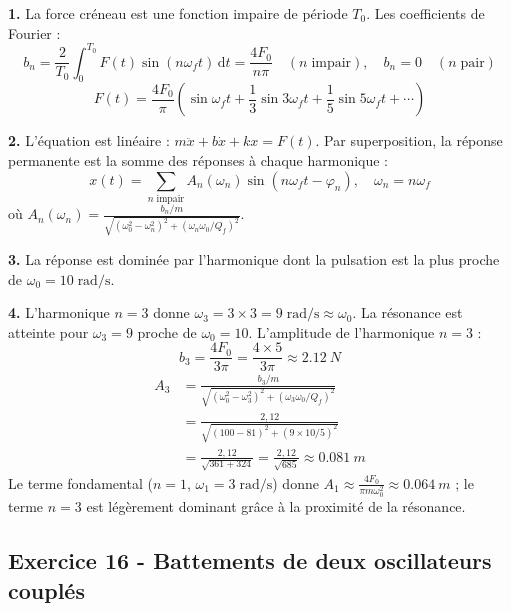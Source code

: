 \documentclass[12pt,a4paper]{article}
\begin{document}
\begin{boitecorrige}
\textbf{1.} La force créneau est une fonction impaire de période $T_0$. Les coefficients de Fourier :
\[
b_n = \frac{2}{T_0}\int_0^{T_0} F(t)\sin(n\omega_f t)\,\text{d}t = \frac{4F_0}{n\pi} \quad (n\;\text{impair}), \quad b_n = 0 \quad (n\;\text{pair})
\]
\[
F(t) = \frac{4F_0}{\pi}\left(\sin\omega_f t + \frac{1}{3}\sin 3\omega_f t + \frac{1}{5}\sin 5\omega_f t + \cdots\right)
\]

\textbf{2.} L'équation est linéaire : $m\ddot{x}+b\dot{x}+kx=F(t)$. Par superposition, la réponse permanente est la somme des réponses à chaque harmonique :
\[
x(t) = \sum_{n\;\text{impair}} A_n(\omega_n)\sin(n\omega_f t - \varphi_n), \quad \omega_n = n\omega_f
\]
où $A_n(\omega_n)=\frac{b_n/m}{\sqrt{(\omega_0^2-\omega_n^2)^2+(\omega_n\omega_0/Q_f)^2}}$.

\textbf{3.} La réponse est dominée par l'harmonique dont la pulsation est la plus proche de $\omega_0=10\;\text{rad/s}$.

\textbf{4.} L'harmonique $n=3$ donne $\omega_3=3\times3=9\;\text{rad/s}\approx\omega_0$. La résonance est atteinte pour $\omega_3=9$ proche de $\omega_0=10$. L'amplitude de l'harmonique $n=3$ :
\[
b_3 = \frac{4F_0}{3\pi} = \frac{4\times5}{3\pi} \approx \qty{2.12}{N}
\]
\begin{align*}
A_3 &= \frac{b_3/m}{\sqrt{(\omega_0^2-\omega_3^2)^2+(\omega_3\omega_0/Q_f)^2}}\\
&= \frac{2{,}12}{\sqrt{(100-81)^2+(9\times10/5)^2}}\\
&= \frac{2{,}12}{\sqrt{361+324}} = \frac{2{,}12}{\sqrt{685}} \approx \qty{0.081}{m}
\end{align*}
Le terme fondamental ($n=1$, $\omega_1=3\;\text{rad/s}$) donne $A_1 \approx \frac{4F_0}{\pi m\omega_0^2}\approx\qty{0.064}{m}$ ; le terme $n=3$ est légèrement dominant grâce à la proximité de la résonance.
\end{boitecorrige}

\subsection*{Exercice 16 - Battements de deux oscillateurs couplés \niveau{\difficile}}
\end{document}
